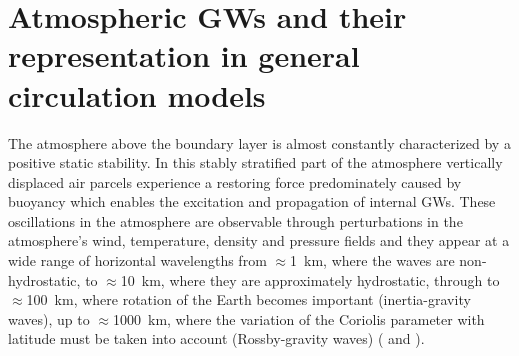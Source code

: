 \section{Atmospheric GWs and their representation in general circulation models}
\label{subsec:GWs}
The atmosphere above the boundary layer is almost constantly characterized by a positive static stability. In this stably stratified part of the atmosphere vertically displaced air parcels experience a restoring force predominately caused by buoyancy which enables the excitation and propagation of internal GWs. These oscillations in the atmosphere are observable through perturbations in the atmosphere's wind, temperature, density and pressure fields and they appear at a wide range of horizontal wavelengths from $\approx$\SI{1}{\kilo\meter}, where the waves are non-hydrostatic, to $\approx$\SI{10}{\kilo\meter}, where they are approximately hydrostatic, through to $\approx$\SI{100}{\kilo\meter}, where rotation of the Earth becomes important (inertia-gravity waves), up to $\approx$\SI{1000}{\kilo\meter}, where the variation of the Coriolis parameter with latitude must be taken into account (Rossby-gravity waves) (\cite{teixeira_physics_2014} and \cite{gill_atmosphere-ocean_1982}).


